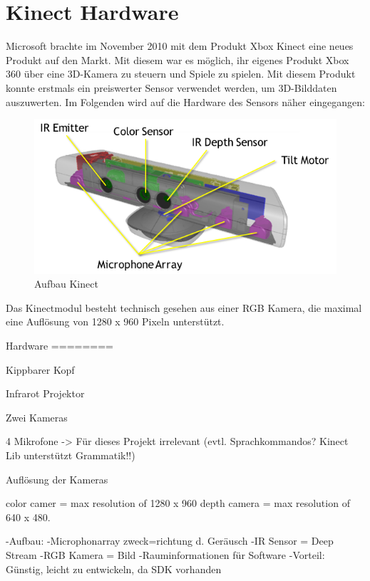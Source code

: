 \section{Kinect Hardware}
Microsoft brachte im November 2010 mit dem Produkt Xbox Kinect eine neues Produkt auf den Markt. Mit diesem war es möglich, ihr eigenes Produkt Xbox 360 über eine 3D-Kamera zu steuern und Spiele zu spielen. 
Mit diesem Produkt konnte erstmals ein preiswerter Sensor verwendet werden, um 3D-Bilddaten auszuwerten.
Im Folgenden wird auf die Hardware des Sensors näher eingegangen:

\begin{figure}[H]						
	\centering							
	\includegraphics[scale=0.9]{Bilder/kinect_sensor_aufbau.png}			
	\caption{Aufbau Kinect\cite{ws:microsoft_kinect}}						
	\label{f:kinect_hardware}						
\end{figure}



Das Kinectmodul besteht technisch gesehen aus einer RGB Kamera, die maximal eine Auflösung von 1280 x 960 Pixeln unterstützt. 
\cite{webb2012beginning}





Hardware
========

Kippbarer Kopf

Infrarot Projektor

Zwei Kameras

4 Mikrofone -> Für dieses Projekt irrelevant (evtl. Sprachkommandos? Kinect Lib unterstützt Grammatik!!)

Auflösung der Kameras

	color camer 	= max resolution of 1280 x 960 
	depth camera 	= max resolution of 640 x 480.

-Aufbau: 	-Microphonarray zweck=richtung d. Geräusch
			-IR Sensor = Deep Stream
			-RGB Kamera = Bild
-Rauminformationen für Software
-Vorteil: Günstig, leicht zu entwickeln, da SDK vorhanden